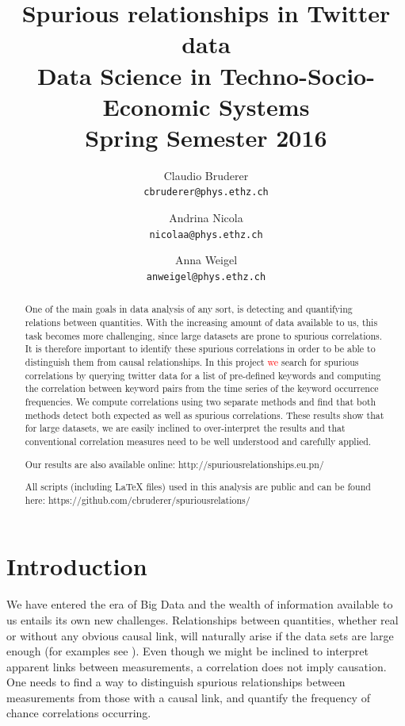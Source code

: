 \documentclass[12pt, a4paper]{article}
\author{
	Claudio Bruderer\\
	\texttt{cbruderer@phys.ethz.ch}
	\and
	Andrina Nicola\\
	\texttt{nicolaa@phys.ethz.ch}
	\and
	Anna Weigel\\
	\texttt{anweigel@phys.ethz.ch}
}
\title{Spurious relationships in Twitter data\\
	 	 \large Data Science in Techno-Socio-Economic Systems\\
	 	 \large Spring Semester 2016}
\begin{document}
\date{}
\maketitle

\begin{abstract}

One of the main goals in data analysis of any sort, is detecting and quantifying relations between quantities. With the increasing amount of data available to us, this task becomes more challenging, since large datasets are prone to spurious correlations. It is therefore important to identify these spurious correlations in order to be able to distinguish them from causal relationships. In this project \textcolor{red}{we} search for spurious correlations by querying twitter data for a list of pre-defined keywords and computing the correlation between keyword pairs from the time series of the keyword occurrence frequencies. We compute correlations using two separate methods and find that both methods detect both expected as well as spurious correlations. These results show that for large datasets, we are easily inclined to over-interpret the results and that conventional correlation measures need to be well understood and carefully applied. 

\noindent Our results are also available online: http://spuriousrelationships.eu.pn/

\noindent All scripts (including \LaTeX$ $ files) used in this analysis are public and can be found here: https://github.com/cbruderer/spuriousrelations/

\end{abstract}


\vspace{0.2in}

\section{Introduction}
We have entered the era of Big Data and the wealth of information available to us entails its own new challenges. Relationships between quantities, whether real or without any obvious causal link, will naturally arise if the data sets are large enough (for examples see \cite{tyler_vigen}). Even though we might be inclined to interpret apparent links between measurements, a correlation does not imply causation. One needs to find a way to distinguish spurious relationships between measurements from those with a causal link, and quantify the frequency of chance correlations occurring.
\end{document}
